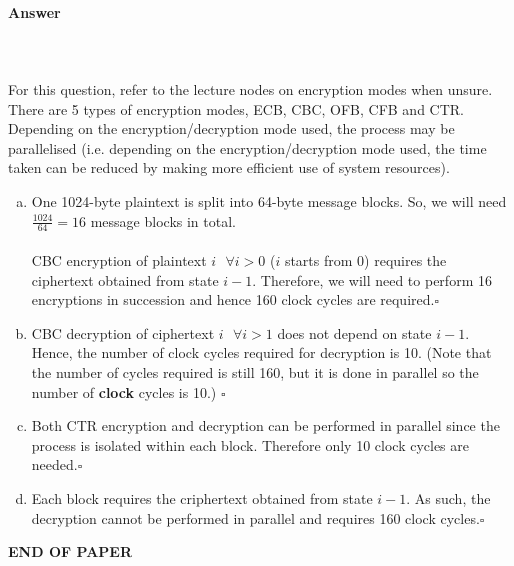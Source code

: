 \documentclass[12pt]{article}
\newcommand{\EOQ}{\hfill $\square$}
\begin{document}
\paragraph{Answer}\mbox{}\\\\
\text{*}For this question, refer to the lecture nodes on encryption modes when unsure. There are 5 types of encryption modes, ECB, CBC, OFB, CFB and CTR. Depending on the encryption/decryption mode used, the process may be parallelised (i.e. depending on the encryption/decryption mode used, the time taken can be reduced by making more efficient use of system resources).
\begin{enumerate}[(a)]
\item One 1024-byte plaintext is split into 64-byte message blocks. So, we will need $\frac{1024}{64}=16$ message blocks in total.\\\\CBC encryption of plaintext $i\text{~~}\forall i>0$ ($i$ starts from 0) requires the ciphertext obtained from state $i-1$. Therefore, we will need to perform 16 encryptions in succession and hence 160 clock cycles are required.\EOQ
\item CBC decryption of ciphertext $i\text{~~}\forall i>1$ does not depend on state $i-1$. Hence, the number of clock cycles required for decryption is 10. (Note that the number of cycles required is still 160, but it is done in parallel so the number of \textbf{clock} cycles is 10.) \EOQ
\item Both CTR encryption and decryption can be performed in parallel since the process is isolated within each block. Therefore only 10 clock cycles are needed.\EOQ
\item Each block requires the criphertext obtained from state $i-1$. As such, the decryption cannot be performed in parallel and requires 160 clock cycles.\EOQ
\end{enumerate}
\bigskip
\vfill
\begin{center}{\bf END OF PAPER}\end{center}
\end{document}
